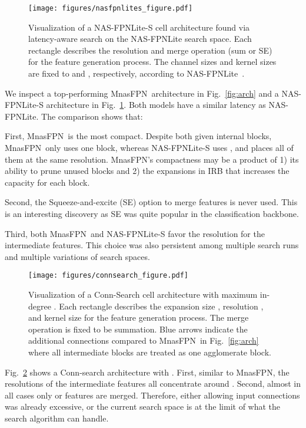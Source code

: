 \documentclass[10pt,twocolumn,letterpaper]{article}
\def\Mnasfpn{MnasFPN~}
\def\Mnasfpnnospace{MnasFPN}
\begin{document}
\begin{figure}[!t]
    \centering
    \texttt{[image: figures/nasfpnlites\_figure.pdf]}
    \caption{Visualization of a NAS-FPNLite-S cell architecture found via latency-aware search on the NAS-FPNLite search space. Each rectangle describes the resolution  and merge operation (sum or SE) for the feature generation process. The channel sizes and kernel sizes are fixed to  and , respectively, according to NAS-FPNLite~\cite{ghiasi2019fpn}. }
    \label{fig:arch_nasfpn}
\end{figure}


We inspect a top-performing \Mnasfpn architecture in Fig.~\ref{fig:arch} and a NAS-FPNLite-S architecture in Fig.~\ref{fig:arch_nasfpn}. Both models have a similar latency as NAS-FPNLite. The comparison shows that:

    First, \Mnasfpn is the most compact. Despite both given  internal blocks, \Mnasfpn only uses one block, whereas NAS-FPNLite-S uses , and places all of them at the same resolution. \Mnasfpnnospace's compactness may be a product of 1) its ability to prune unused blocks and 2) the expansions in IRB that increases the capacity for each block.
    
    Second, the Squeeze-and-excite (SE) option to merge features is never used. This is an interesting discovery as SE was quite popular in the classification backbone.
    
    Third, both \Mnasfpn and NAS-FPNLite-S favor the  resolution for the intermediate features. This choice was also persistent among multiple search runs and multiple variations of search spaces.


\begin{figure}[!t]
    \centering
    \texttt{[image: figures/connsearch\_figure.pdf]}
    \caption{Visualization of a Conn-Search cell architecture with maximum in-degree . Each rectangle describes the expansion size , resolution , and kernel size  for the feature generation process. The merge operation is fixed to be summation. Blue arrows indicate the additional connections compared to \Mnasfpn in Fig.~\ref{fig:arch} where all intermediate blocks are treated as one agglomerate block. }
    \label{fig:connsearch_arch}
\end{figure}

Fig.~\ref{fig:connsearch_arch} shows a Conn-search architecture with . First, similar to \Mnasfpnnospace, the resolutions of the intermediate features all concentrate around . Second, almost in all cases only  or  features are merged. Therefore, either allowing  input connections was already excessive, or the current search space is at the limit of what the search algorithm can handle. 
\end{document}
